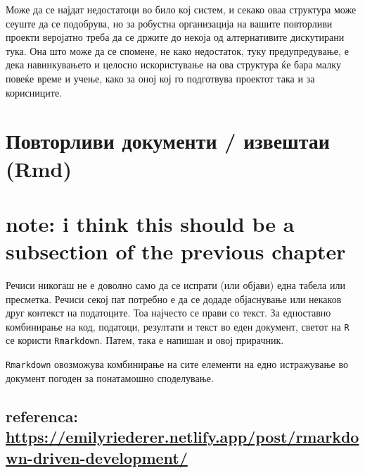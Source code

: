 \documentclass[
]{book}
\begin{document}
Може да се најдат недостатоци во било кој систем, и секако оваа структура може сеуште да се подобрува, но за робустна организација на вашите повторливи проекти веројатно треба да се држите до некоја од алтернативите дискутирани тука. Она што може да се спомене, не како недостаток, туку предупредување, е дека навинкувањето и целосно искористување на ова структура ќе бара малку повеќе време и учење, како за оној кој го подготвува проектот така и за корисниците.

\hypertarget{ux43fux43eux432ux442ux43eux440ux43bux438ux432ux438-ux434ux43eux43aux443ux43cux435ux43dux442ux438-ux438ux437ux432ux435ux448ux442ux430ux438-rmd}{%
\chapter{Повторливи документи / извештаи (Rmd)}\label{ux43fux43eux432ux442ux43eux440ux43bux438ux432ux438-ux434ux43eux43aux443ux43cux435ux43dux442ux438-ux438ux437ux432ux435ux448ux442ux430ux438-rmd}}

\hypertarget{note-i-think-this-should-be-a-subsection-of-the-previous-chapter}{%
\chapter{note: i think this should be a subsection of the previous chapter}\label{note-i-think-this-should-be-a-subsection-of-the-previous-chapter}}

Речиси никогаш не е доволно само да се испрати (или објави) една табела или пресметка. Речиси секој пат потребно е да се додаде објаснување или некаков друг контекст на податоците. Тоа најчесто се прави со текст. За едноставно комбинирање на код, податоци, резултати и текст во еден документ, светот на \texttt{R} се користи \texttt{Rmarkdown}. Патем, така е напишан и овој прирачник.

\texttt{Rmarkdown} овозможува комбинирање на сите елементи на едно истражување во документ погоден за понатамошно споделување.

\hypertarget{referenca-httpsemilyriederer.netlify.apppostrmarkdown-driven-development}{%
\section{\texorpdfstring{referenca: \url{https://emilyriederer.netlify.app/post/rmarkdown-driven-development/}}{referenca: https://emilyriederer.netlify.app/post/rmarkdown-driven-development/}}\label{referenca-httpsemilyriederer.netlify.apppostrmarkdown-driven-development}}
\end{document}
